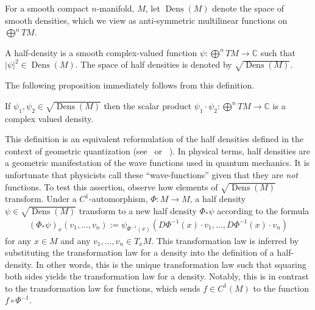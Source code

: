 \documentclass[final,leqno]{siamart}
\DeclareMathOperator{\Dens}{Dens}
\begin{document}
For a smooth compact $n$-manifold, $M$, let $\Dens(M)$ denote the space of smooth densities, which we view as anti-symmetric multilinear functions on $\bigoplus^n TM$.
\begin{definition}\label{def:half density}
	A half-density is a smooth complex-valued function $\psi : \bigoplus^n TM \to \mathbb{C}$
	such that $| \psi |^{2} \in \Dens(M)$.
	The space of half densities is denoted by $\sqrt{\Dens(M)}$.
\end{definition}

The following proposition immediately follows from this definition.
\begin{proposition} \label{prop:half densities}
	If $\psi_{1}, \psi_{2} \in \sqrt{\Dens(M)}$ then the scalar product $\psi_{1} \cdot \psi_{2} : \bigoplus^{n} TM \to \mathbb{C}$ is a complex valued density. 
\end{proposition}

This definition is an equivalent reformulation of the half densities defined in the context of geometric quantization (see~\cite[Chapter 4]{GuilleminSternberg1970} or ~\cite[Appendix A]{BatesWeinstein1997}).
In physical terms, half densities are a geometric manifestation of the wave functions used in quantum mechanics.
It is unfortunate that physicists call these ``wave-functions'' given that they are \emph{not} functions.
To test this assertion, observe how elements of $\sqrt{\Dens(M)}$ transform.
Under a $C^{1}$-automorphism, $\Phi: M \to M$, a half density $\psi \in \sqrt{ \Dens(M) }$ transform to a new half density $\Phi_{*}\psi$ according to the formula
\begin{align}
	(\Phi_{*}\psi)_{x}(v_{1},\dots,v_{n}) := \psi_{ \Phi^{-1}(x) } ( D\Phi^{-1}(x) \cdot v_{1} , \dots , D\Phi^{-1}(x) \cdot v_{n} ) \label{eq:transformation law}
\end{align}
for any $x \in M$ and any $v_{1}, \dots , v_{n} \in T_{x}M$.
This transformation law is inferred by substituting the transformation law for a density into the definition of a half-density.
In other words, this is the unique transformation law such that squaring both sides yields the transformation law for a density.
Notably, this is in contrast to the transformation law for functions, which sends $f \in C^{1}(M)$ to the function $f \circ \Phi^{-1}$.
\end{document}
